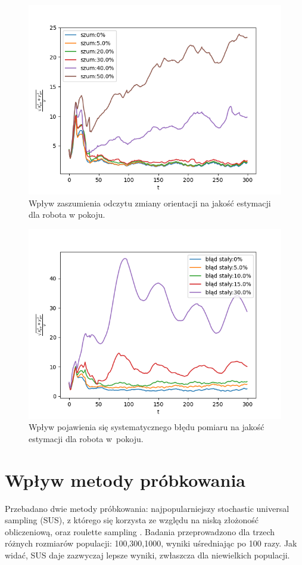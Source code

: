 \begin{figure}[H]
	\begin{center}
		\includegraphics[width=12cm]{./wplyw_szumu_ori.png}
		\caption{Wpływ zaszumienia odczytu zmiany orientacji na jakość estymacji dla robota w pokoju.}
		\label{wplyw_szumu_ori}
	\end{center}
\end{figure}

\begin{figure}[H]
	\begin{center}
		\includegraphics[width=12cm]{./blad_staly.png}
		\caption{Wpływ pojawienia się systematycznego błędu pomiaru na jakość estymacji dla robota w~pokoju.}
		\label{blad_staly}
	\end{center}
\end{figure}

\section{Wpływ metody próbkowania}
Przebadano dwie metody próbkowania: najpopularniejszy stochastic universal sampling \cite{sus_wiki} (SUS), z którego się korzysta ze względu na niską złożoność obliczeniową, oraz roulette sampling \cite{rou_wiki}. Badania przeprowadzono dla trzech różnych rozmiarów populacji: 100,300,1000, wyniki uśredniając po 100 razy. Jak widać, SUS daje zazwyczaj lepsze wyniki, zwłaszcza dla niewielkich populacji. 

